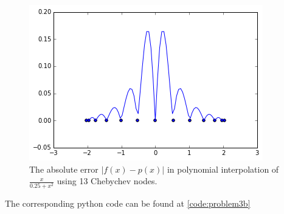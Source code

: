 \documentclass[a4paper,11pt]{article}
\begin{document}
\begin{figure}[h]
    \centering
    \includegraphics[scale=0.65]{err2.png}
    \caption{The absolute error $|f(x) - p(x)|$ in polynomial interpolation of $\frac{x}{0.25 + x^2}$ using 13 Chebychev nodes.}
    \label{fig:err2}
\end{figure}


The corresponding python code can be found at \ref{code:problem3b}
\clearpage

\clearpage

\clearpage
\end{document}
